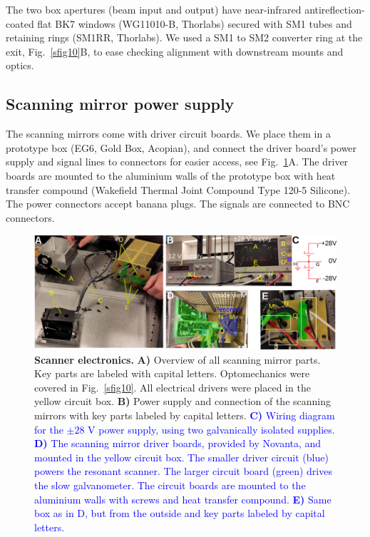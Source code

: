 \documentclass[10pt,letterpaper]{article}
\begin{document}
The two box apertures (beam input and output) have near-infrared antireflection-coated flat BK7 windows (WG11010-B, Thorlabs) secured with SM1 tubes and retaining rings (SM1RR, Thorlabs). We used a SM1 to SM2 converter ring at the exit, Fig.~\ref{sfig10}B, to ease checking alignment with downstream mounts and optics.

\subsection{Scanning mirror power supply}
%
The scanning mirrors come with driver circuit boards. We place them in a prototype box (EG6, Gold Box, Acopian), and connect the driver board's power supply and signal lines to connectors for easier access, see Fig.~\ref{sfig11}A. The driver boards are mounted to the aluminium walls of the prototype box with heat transfer compound (Wakefield Thermal Joint Compound Type 120-5 Silicone). The power connectors accept banana plugs. The signals are connected to BNC connectors. 
%
\begin{figure}[t]
    \includegraphics[width=\textwidth]{sfig11.jpg}
  \caption{{\bf Scanner electronics.} \textbf{A)} Overview of all scanning mirror parts. Key parts are labeled with capital letters. Optomechanics were covered in Fig.~\ref{sfig10}. All electrical drivers were placed in the yellow circuit box. \textbf{B)} Power supply and connection of the scanning mirrors with key parts labeled by capital letters. \textcolor{blue}{\textbf{C)} Wiring diagram for the $\pm 28\text{ V}$ power supply, using two galvanically isolated supplies. \textbf{D)} The scanning mirror driver boards, provided by Novanta, and mounted in the yellow circuit box. The smaller driver circuit (blue) powers the resonant scanner. The larger circuit board (green) drives the slow galvanometer. The circuit boards are mounted to the aluminium walls with screws and heat transfer compound. \textbf{E)} Same box as in D, but from the outside and key parts labeled by capital letters.}}
  \label{sfig11}
\end{figure}
\end{document}
